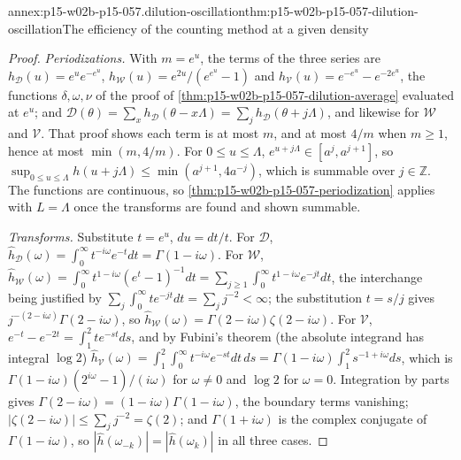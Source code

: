 \begin{annexitem}{annex:p15-w02b-p15-057.dilution-oscillation}{thm:p15-w02b-p15-057-dilution-oscillation}{The efficiency of the counting method at a given density}
\begin{proof}
\emph{Periodizations.} With \(m=e^u\), the terms of the three series are
\(h_{\mathcal D}(u)=e^ue^{-e^u}\), \(h_{\mathcal W}(u)=e^{2u}/(e^{e^u}-1)\)
and \(h_{\mathcal V}(u)=e^{-e^u}-e^{-2e^u}\), the functions
\(\delta,\omega,\nu\) of the proof of
\cref{thm:p15-w02b-p15-057-dilution-average} evaluated at \(e^u\); and
\(\mathcal D(\theta)=\sum_xh_{\mathcal D}(\theta-x\Lambda)
=\sum_jh_{\mathcal D}(\theta+j\Lambda)\), and likewise for \(\mathcal W\) and
\(\mathcal V\). That proof shows each term is at most \(m\), and at most
\(4/m\) when \(m\geq1\), hence at most \(\min(m,4/m)\). For
\(0\leq u\leq\Lambda\), \(e^{u+j\Lambda}\in[a^j,a^{j+1}]\), so
\(\sup_{0\leq u\leq\Lambda}h(u+j\Lambda)\leq\min(a^{j+1},4a^{-j})\), which
is summable over \(j\in\mathbb Z\). The functions are continuous, so
\cref{thm:p15-w02b-p15-057-periodization} applies with \(L=\Lambda\) once
the transforms are found and shown summable.

\emph{Transforms.} Substitute \(t=e^u\), \(du=dt/t\). For \(\mathcal D\),
\(\widehat h_{\mathcal D}(\omega)=\int_0^\infty t^{-i\omega}e^{-t}dt=
\Gamma(1-i\omega)\). For \(\mathcal W\),
\(\widehat h_{\mathcal W}(\omega)=\int_0^\infty t^{1-i\omega}(e^t-1)^{-1}dt
=\sum_{j\geq1}\int_0^\infty t^{1-i\omega}e^{-jt}dt\), the interchange being
justified by \(\sum_j\int_0^\infty te^{-jt}dt=\sum_jj^{-2}<\infty\); the
substitution \(t=s/j\) gives \(j^{-(2-i\omega)}\Gamma(2-i\omega)\), so
\(\widehat h_{\mathcal W}(\omega)=\Gamma(2-i\omega)\zeta(2-i\omega)\). For
\(\mathcal V\), \(e^{-t}-e^{-2t}=\int_1^2te^{-st}ds\), and by Fubini's
theorem (the absolute integrand has integral \(\log2\))
\(\widehat h_{\mathcal V}(\omega)=\int_1^2\int_0^\infty t^{-i\omega}e^{-st}dt\,ds
=\Gamma(1-i\omega)\int_1^2s^{-1+i\omega}ds\), which is
\(\Gamma(1-i\omega)(2^{i\omega}-1)/(i\omega)\) for \(\omega\neq0\) and
\(\log2\) for \(\omega=0\). Integration by parts gives
\(\Gamma(2-i\omega)=(1-i\omega)\Gamma(1-i\omega)\), the boundary terms
vanishing; \(|\zeta(2-i\omega)|\leq\sum_jj^{-2}=\zeta(2)\); and
\(\Gamma(1+i\omega)\) is the complex conjugate of \(\Gamma(1-i\omega)\), so
\(|\widehat h(\omega_{-k})|=|\widehat h(\omega_k)|\) in all three cases.


\end{proof}
\end{annexitem}
